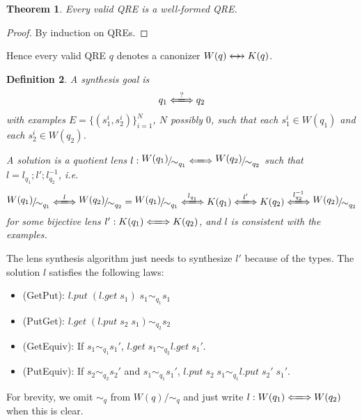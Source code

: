 \documentclass[a4paper,11pt] {article}
\theoremstyle{plain}
\newtheorem{theorem}{Theorem}[section]
\newtheorem{definition}[theorem]{Definition}
\newcommand{\negjoinrel}{\mathrel{\mkern3mu}}
\newcommand{\rlaprel}[1]{\mathrel{\mathrlap{#1}}}
\newcommand{\lget}[1]{\textit{$#1$.get}}
\newcommand{\lput}[1]{\textit{$#1$.put}}
\newcommand{\lcreate}[1]{\textit{$#1$.create}}
\newcommand{\canon}{\rlaprel{\longleftarrow}\rlaprel{\longrightarrow}
  \negjoinrel\rightarrow\;\,}
\newcommand{\lensbetween}[1]{\xLongleftrightarrow{#1}}
\newcommand{\name}[1]{\textsf{#1}}
\newcommand{\niceFrac}[2]{%
    \raise.5ex\hbox{$#1$}%
    \kern-.1em/\kern-.15em%
    \lower.25ex\hbox{$#2$}}
\begin{document}
\begin{theorem}
  Every valid QRE is a well-formed QRE.
\end{theorem}
\begin{proof}
  By induction on QREs.
\end{proof}
Hence every valid QRE $q$ denotes a canonizer $W(q) \canon K(q)$.

\begin{definition}
  A synthesis goal is 
  \begin{align*}
    q_1 \lensbetween{?} q_2
  \end{align*}
  with examples
  $E = \{(s_1^i, s_2^i)\}_{i=1}^N$, $N$ possibly $0$,
  such that each $s_1^i \in W(q_1)$ and each $s_2^i \in W(q_2)$.
  
  A solution is a quotient lens
  $l: \niceFrac{W(q_1)}{\sim_{q_1}} \lensbetween{} \niceFrac{W(q_2)}{\sim_{q_2}}$
  such that $l = l_{q_1} ; l' ; l_{q_2}^{-1}$, i.e.
  \begin{align*}
    \niceFrac{W(q_1)}{\sim_{q_1}} \lensbetween{l} \niceFrac{W(q_2)}{\sim_{q_2}}
    = \niceFrac{W(q_1)}{\sim_{q_1}} \lensbetween{l_{q_1}} K(q_1) \lensbetween{l'} K(q_2)
    \lensbetween{l_{q_2}^{-1}} \niceFrac{W(q_2)}{\sim_{q_2}}
  \end{align*}
  for some bijective lens
  $l': K(q_1) \lensbetween{} K(q_2)$, and 
  $l$ is consistent with the examples.
\end{definition}
The lens synthesis algorithm just needs to synthesize $l'$
because of the types. The solution $l$ satisfies the following laws:
\begin{itemize}
\item (\name{GetPut}): $\lput{l} \; (\lget{l} \; s_1) \; s_1 \sim_{q_1} s_1$ 
\item (\name{PutGet}): $\lget{l} \; (\lput{l} \; s_2 \; s_1) \sim_{q_2} s_2$
\item (\name{GetEquiv}): If $s_1 \sim_{q_1} s_1'$, $\lget{l} \; s_1
  \sim_{q_2} \lget{l} \; s_1'$.
\item (\name{PutEquiv}): If $s_2 \sim_{q_2} s_2'$ and $s_1 \sim_{q_1} s_1'$,
  $\lput{l} \; s_2 \; s_1 \sim_{q_1} \lput{l} \; s_2' \; s_1'$.
\end{itemize}
For brevity, we omit $\sim_{q}$ from $W(q)/\sim_{q}$ and just write
$l: W(q_1) \lensbetween{} W(q_2)$ when this is clear.
\end{document}
